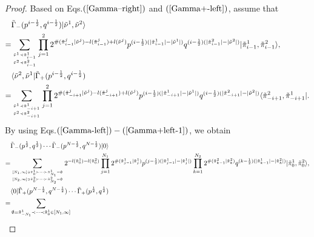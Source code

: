 \documentclass[11pt,reqno]{amsart}
\numberwithin{equation}{section}
\begin{document}
	\begin{proof}
		Based on Eqs.$(\ref{Gamma--right})$ and $(\ref{Gamma+-left})$, assume that
		\begin{align}
			&\tilde{\Gamma}_-(p^{i-\frac{1}{2}},q^{i-\frac{1}{2}}) |\tilde{\nu}^1,\tilde{\nu}^2 \rangle\notag\\
			=&\sum_{{\tilde{\nu}^1 \prec \tilde{\pi}^1_{i-1}}	\atop{\tilde{\nu}^2 \prec \tilde{\pi}^2_{i-1}}}
			\prod_{j=1}^{2}
			2^{\#(\tilde{\pi}^j_{i-1}|\tilde{\nu}^j) - l(\tilde{\pi}^j_{i-1})+l(\tilde{\nu}^j)}
			p^{(i-\frac{1}{2})(|\tilde{\pi}^1_{i-1}| - |\tilde{\nu}^1|)}  q^{(i-\frac{1}{2})(|\tilde{\pi}^2_{i-1}| - |\tilde{\nu}^2|)} |\tilde{\pi}^1_{i-1},\tilde{\pi}^2_{i-1} \rangle,  \\
			&\langle \tilde{\nu}^2,\tilde{\nu}^1|\tilde{\Gamma}_+(p^{i-\frac{1}{2}},q^{i-\frac{1}{2}})\notag\\
			=&\sum_{{\tilde{\nu}^1 \prec \tilde{\pi}^1_{-i+1}}	\atop{\tilde{\nu}^2 \prec \tilde{\pi}^2_{-i+1}}}
			\prod_{j=1}^{2}	
			2^{\#(\tilde{\pi}^j_{-i+1}|\tilde{\nu}^{j}) - l(\tilde{\pi}^j_{-i+1})+l(\tilde{\nu}^{j})}
			p^{(i-\frac{1}{2})(|\tilde{\pi}^1_{-i+1}| - |\tilde{\nu}^1|)}    q^{(i-\frac{1}{2})(|\tilde{\pi}^2_{-i+1}| - |\tilde{\nu}^2|)}     \langle \tilde{\pi}^2_{-i+1},\tilde{\pi}^1_{-i+1}|.
		\end{align}
		By using Eqs.$(\ref{Gamma-left})-(\ref{Gamma+left-1})$, we obtain
		\begin{align}
			&\tilde{\Gamma}_-(p^{\frac{1}{2}},q^{\frac{1}{2}})\cdots\tilde{\Gamma}_-(p^{N - \frac{1}{2}},q^{N - \frac{1}{2}})
			|0\rangle \notag\\
			=&	\sum_{{ [N_{1}, \infty]  \ni \tilde{\pi}^{1}_0 \succ \cdots \succ \tilde{\pi}^{1}_{N_{1}} = \emptyset}
				\atop{[N_{2}, \infty]  \ni \tilde{\pi}^{2}_0 \succ \cdots \succ \tilde{\pi}^{2}_{N_{2}} = \emptyset}}
			2^{-l(\tilde{\pi}^1_{0})-l(\tilde{\pi}^2_{0})}
			\prod_{j=1}^{N_1}
			2^{\#(\tilde{\pi}^1_{j-1}|\tilde{\pi}^1_{j})}	p^{(j-\frac{1}{2})(|\tilde{\pi}^1_{j-1}| - |\tilde{\pi}^1_{j}|)}  \prod_{k=1}^{N_2}	
			2^{\#(\tilde{\pi}^2_{k-1}|\tilde{\pi}^2_{k})}
			q^{(k-\frac{1}{2})(|\tilde{\pi}^1_{k-1}| - |\tilde{\pi}^2_{k}|)}  |\tilde{\pi}^{1}_0,\tilde{\pi}^{2}_0\rangle,\label{right-scalar-product} \\
			&\langle 0|
			\tilde{\Gamma}_+(p^{N - \frac{1}{2}},q^{N - \frac{1}{2}})\cdots
			\tilde{\Gamma}_+(p^{\frac{1}{2}},q^{\frac{1}{2}})\notag\\
			=&\sum_{{ \emptyset=\tilde{\pi}^{1}_{-N_{1}} \prec \cdots \prec \tilde{\pi}^{1}_0 \in [N_{1}, \infty]  }
}
\end{align}
\end{proof}
\end{document}
